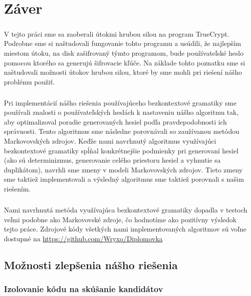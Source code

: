 \chapter{Záver}

\paragraph{}
V tejto práci sme sa zaoberali útokmi hrubou silou na program TrueCrypt. Podrobne sme si naštudovali fungovanie tohto programu a usúdili, že najlepším miestom útoku, na disk zašifrovaný týmto programom, bude používateľské heslo pomocou ktorého sa generujú šifrovacie kľúče. Na základe tohto poznatku sme si naštudovali možnosti útokov hrubou silou, ktoré by sme mohli pri riešení nášho problému použiť.

\paragraph{}
Pri implementácií nášho riešenia používajúceho bezkontextové gramatiky sme používali znalosti o používateľských heslách k nastaveniu nášho algoritmu tak, aby optimalizoval poradie generovaných hesiel podľa pravdepodobnosti ich správnosti. Tento algoritmus sme následne porovnávali so zaužívanou metódou Markovovských zdrojov. Keďže nami navrhnutý algoritmus využívajúci bezkontextové gramatiky spĺňal konkrétnejšie podmienky pri generovaní hesiel (ako sú determinizmus, generovanie celého priestoru hesiel a vyhnutie sa duplikátom), navrhli sme zmeny v modeli Markovovských zdrojov. Tieto zmeny sme taktiež implementovali a výsledný algoritmus sme taktiež porovnali s našim riešením. 

\paragraph{}
Nami navrhnutá metóda využívajúca bezkontextové gramatiky dopadla v testoch veľmi podobne ako Markovovské zdroje, čo hodnotíme ako pozitívny výsledok tejto práce. Zdrojové kódy všetkých nami implementovaných algoritmov sú voľne dostupné na \url{https://github.com/Wryxo/Diplomovka}

\section{Možnosti zlepšenia nášho riešenia}
\subsection{Izolovanie kódu na skúšanie kandidátov}
